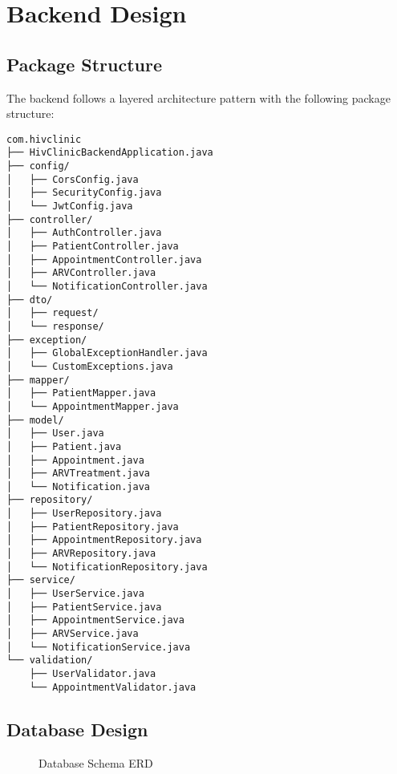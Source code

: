 \documentclass[12pt,a4paper]{article}
\begin{document}
\section{Backend Design}

\subsection{Package Structure}

The backend follows a layered architecture pattern with the following package structure:

\begin{lstlisting}[language=text, caption=Backend Package Structure]
com.hivclinic
├── HivClinicBackendApplication.java
├── config/
│   ├── CorsConfig.java
│   ├── SecurityConfig.java
│   └── JwtConfig.java
├── controller/
│   ├── AuthController.java
│   ├── PatientController.java
│   ├── AppointmentController.java
│   ├── ARVController.java
│   └── NotificationController.java
├── dto/
│   ├── request/
│   └── response/
├── exception/
│   ├── GlobalExceptionHandler.java
│   └── CustomExceptions.java
├── mapper/
│   ├── PatientMapper.java
│   └── AppointmentMapper.java
├── model/
│   ├── User.java
│   ├── Patient.java
│   ├── Appointment.java
│   ├── ARVTreatment.java
│   └── Notification.java
├── repository/
│   ├── UserRepository.java
│   ├── PatientRepository.java
│   ├── AppointmentRepository.java
│   ├── ARVRepository.java
│   └── NotificationRepository.java
├── service/
│   ├── UserService.java
│   ├── PatientService.java
│   ├── AppointmentService.java
│   ├── ARVService.java
│   └── NotificationService.java
└── validation/
    ├── UserValidator.java
    └── AppointmentValidator.java
\end{lstlisting}

\subsection{Database Design}

\begin{figure}[H]
\centering
{}
\caption{Database Schema ERD}
\label{fig:database-schema}
\end{figure}
\end{document}
